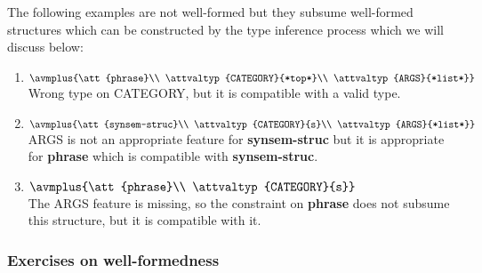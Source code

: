 \documentclass[12pt]{report}
\begin{document}
The following examples are not well-formed but they
subsume well-formed structures which can be constructed
by the type inference process 
which we will discuss below:
\begin{enumerate}
\item
{\tiny $\avmplus{\att{phrase}\\
\attvaltyp{CATEGORY}{*top*}\\
\attvaltyp{ARGS}{*list*}}$}\\
Wrong type on CATEGORY, but it is compatible with
a valid type.
\item
{\tiny $\avmplus{\att{synsem-struc}\\
\attvaltyp{CATEGORY}{s}\\
\attvaltyp{ARGS}{*list*}}$}\\
ARGS is not an appropriate feature for
{\bf synsem-struc} but it is appropriate
for {\bf phrase} which is compatible with
{\bf synsem-struc}.
\item
{\tiny $\avmplus{\att{phrase}\\
\attvaltyp{CATEGORY}{s}}$}\\
The ARGS feature is missing,
so the constraint on {\bf phrase} does not
subsume this structure, but it is compatible with it.
\end{enumerate}

\subsubsection{Exercises on well-formedness}
\end{document}
